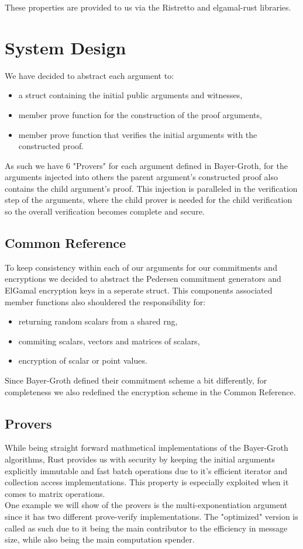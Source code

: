 \documentclass[12pt,a4paper]{report}
\begin{document}
These properties are provided to us via the Ristretto and elgamal-rust\cite{egrust} libraries.
\section{System Design}
We have decided to abstract each argument to:
\begin{itemize}
	\item a struct containing the initial public arguments and witnesses,
	\item member prove function for the construction of the proof arguments,
	\item member prove function that verifies the initial arguments with the constructed proof.
\end{itemize}
As such we have 6 "Provers" for each argument defined in Bayer-Groth, for the arguments injected into others
the parent argument's constructed proof also contains the child argument's proof. This injection is paralleled
in the verification step of the arguments, where the child prover is needed for the child verification
so the overall verification becomes complete and secure.

\subsection{Common Reference}
To keep consistency within each of our arguments for our commitments and encryptions we decided to abstract 
the Pedersen commitment generators and ElGamal encryption keys in a seperate struct. This components associated
member functions also shouldered the responsibility for: 
\begin{itemize}
	\item returning random scalars from a shared rng, 
	\item commiting scalars, vectors and matrices of scalars, 
	\item encryption of scalar or point values.
\end{itemize}
Since Bayer-Groth defined their commitment scheme a bit differently, for completeness we also redefined 
the encryption scheme in the Common Reference.

\subsection{Provers}
While being straight forward mathmetical implementations of the Bayer-Groth algorithms, Rust provides us with
security by keeping the initial arguments explicitly immutable and fast batch operations due to it's efficient
iterator and collection access implementations.
This property is especially exploited when it comes to matrix operations.\\
One example we will show of the provers is the multi-exponentiation argument since it has two different prove-verify
implementations. The "optimized" version is called as such due to it being the main contributor to the efficiency in message size,
while also being the main computation spender.
\end{document}
